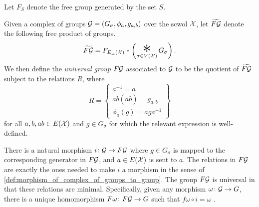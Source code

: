 Let $F_S$ denote the free group generated by the set $S$.
\begin{definition}
	Given a complex of groups $\mathcal{G} = (G_\sigma, \phi_a, g_{a,b})$ over the scwol $\mathcal{X}$, let $\widetilde{F\mathcal{G}}$ denote the following free product of groups.
	\[
		\widetilde{F\calg} =  F_{E_\pm(\calx)} \ast \left( \bigast_{\sigma \in V(\calx)} G_\sigma \right)
		.\]
	We then define the \emph{universal group} $F\mathcal{G}$ associated to $\mathcal{G}$ to be the quotient of $\widetilde{F\mathcal{G}}$ subject to the relations  $R$, where
	\[
		R = \left\{
		\begin{array}{l}
			a^{-1}   = \bar{a}     \\
			ab(\bar{ab}) = g_{a,b} \\
			\phi_a(g)    = aga^{-1}
		\end{array}
		\right\}
	\]
	for all $a,b,ab \in E(\mathcal{X})$ and $g \in G_\sigma$ for which the relevant expression is well-defined.
	\label{def:complex_of_groups_universal_group}
\end{definition}
There is a natural morphism $i \colon \mathcal{G} \to F\mathcal{G}$ where $g \in G_\sigma$ is mapped to the corresponding generator in $F\mathcal{G}$, and  $a \in E(\mathcal{X})$ is sent to $a$.
The relations in $F\mathcal{G}$ are exactly the ones needed to make  $i$ a morphism in the sense of \cref{def:morphism_of_complex_of_groups_to_group}.
The group $F\mathcal{G}$ is universal in that these relations are minimal.
Specifically, given any morphism $\omega \colon \mathcal{G} \to G$, there is a unique homomorphism $F\omega \colon F\mathcal{G} \to G$ such that $f\omega \circ i = \omega$ \cite[Chapter 3.\textrm{\ensuremath{\calc}}, Section 3.2]{BrHa11}.

